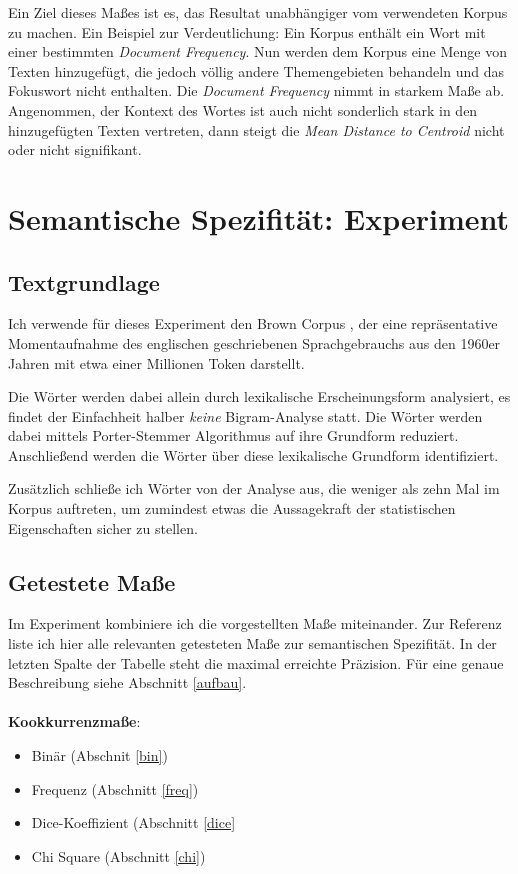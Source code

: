\documentclass[11pt,numbers=noenddot]{scrartcl}
\begin{document}
Ein Ziel dieses Maßes ist es, das Resultat unabhängiger vom verwendeten Korpus zu machen. Ein Beispiel zur Verdeutlichung: Ein Korpus enthält ein Wort mit einer bestimmten \emph{Document Frequency}. Nun werden dem Korpus eine Menge von Texten hinzugefügt, die jedoch völlig andere Themengebieten behandeln und das Fokuswort nicht enthalten. Die \emph{Document Frequency} nimmt in starkem Maße ab. Angenommen, der Kontext des Wortes ist auch nicht sonderlich stark in den hinzugefügten Texten vertreten, dann steigt die \emph{Mean Distance to Centroid} nicht oder nicht signifikant.

\section{Semantische Spezifität: Experiment}

\subsection{Textgrundlage}

Ich verwende für dieses Experiment den Brown Corpus \citep{francis1979brown}, der eine repräsentative Momentaufnahme des englischen geschriebenen Sprachgebrauchs aus den 1960er Jahren mit etwa einer Millionen Token darstellt.

Die Wörter werden dabei allein durch lexikalische Erscheinungsform analysiert, es findet der Einfachheit halber \emph{keine} Bigram-Analyse statt. Die Wörter werden dabei mittels Porter-Stemmer Algorithmus \citep{Porter:1997:ASS:275537.275705} auf ihre Grundform reduziert. Anschließend werden die Wörter über diese lexikalische Grundform identifiziert.

Zusätzlich schließe ich Wörter von der Analyse aus, die weniger als zehn Mal im Korpus auftreten, um zumindest etwas die Aussagekraft der statistischen Eigenschaften sicher zu stellen.

\subsection{Getestete Maße}

Im Experiment kombiniere ich die vorgestellten Maße miteinander. Zur Referenz liste ich hier alle relevanten getesteten Maße zur semantischen Spezifität. In der letzten Spalte der Tabelle steht die maximal erreichte Präzision. Für eine genaue Beschreibung siehe Abschnitt \ref{aufbau}.
\\\\
\textbf{Kookkurrenzmaße}:
\begin{itemize}
    \item Binär (Abschnit \ref{bin})
    \item Frequenz (Abschnitt \ref{freq})
    \item Dice-Koeffizient (Abschnitt \ref{dice}
    \item Chi Square (Abschnitt \ref{chi})
\end{itemize}
\end{document}
